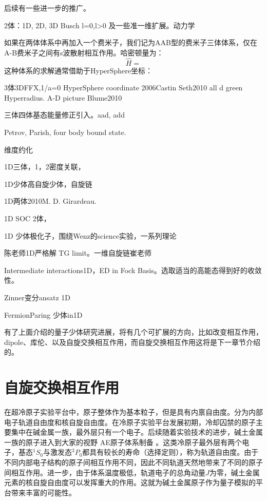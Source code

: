 {\color{red}后续有一些进一步的推广。}

2体：1D, 2D, 3D Busch l=0,l>0 及一些准一维扩展。动力学 \cite{Idziaszek2bdynamics}



如果在两体体系中再加入一个费米子，我们记为AAB型的费米子三体体系，仅在A-B费米子之间有s波散射相互作用。哈密顿量为：
\begin{equation}
 \hat{H} = 
\end{equation}
这种体系的求解通常借助于HyperSphere坐标：


3体3DFFX,1/a=0
HyperSphere coordinate
2006Castin 
Seth2010 all d green Hyperradius.
A-D picture
Blume2010\cite{OlshaniiRigorous2001,Petrov2003unitary3b,Fleix2006prlunitary3b,Felix2006praunitary3b,LmDuan2007levelcrossing,Stetcu2007,Blume2008,Blume2010,Xiaji2009prl,Xiaji20103b,Rittenhouse2010green}




三体四体基态能量修正引入。a{ad}, a{dd}

Petrov, Parish, four body bound state.

维度约化\cite{Xiaij2D3b,blume2012}


1D三体，1，2密度关联，

1D少体高自旋少体，自旋链

1D两体2010M. D. Girardeau. 

1D SOC 2体，

1D 少体极化子，围绕Wenz的science实验，一系列理论

陈老师1D严格解 TG limit。一维自旋链崔老师

Intermediate interactions1D，ED in Fock Basis。选取适当的高能态得到好的收敛性。

Zinner变分ansatz 1D

FermionParing 少体in1D



有了上面介绍的量子少体研究进展，将有几个可扩展的方向，比如改变相互作用，dipole、库伦、以及自旋交换相互作用，而自旋交换相互作用这将是下一章节介绍的。

\section{自旋交换相互作用}\label{sec:spin-exchange}
在超冷原子实验平台中，原子整体作为基本粒子，但是具有内禀自由度。分为内部电子轨道自由度和核自旋自由度。在冷原子实验平台发展初期，冷却囚禁的原子主要集中在碱金属一族，最外层只有一个电子。后续随着实验技术的进步，碱土金属一族的原子进入到大家的视野{\color{red} AE原子体系制备 }。这类冷原子最外层有两个电子，基态${}^1S_0$与激发态${}^3P_0$都具有较长的寿命（选择定则），称为轨道自由度。由于不同内部电子结构的原子间相互作用不同，因此不同轨道天然地带来了不同的原子间相互作用。进一步，由于体系温度极低，轨道电子的总角动量$J$为零，碱土金属元素的核自旋自由度可以发挥重大的作用。这就为碱土金属原子作为量子模拟的平台带来丰富的可能性。

